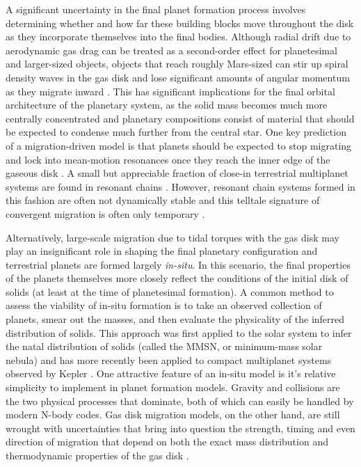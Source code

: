 A significant uncertainty in the final planet formation process involves determining whether and how far these building blocks move throughout the disk as they incorporate themselves into the final bodies. Although radial drift due to aerodynamic gas drag can be treated as a second-order effect for planetesimal and larger-sized objects, objects that reach roughly Mars-sized can stir up spiral density waves in the gas disk and lose significant amounts of angular momentum as they migrate inward \cite{ward97}. This has significant implications for the final orbital architecture of the planetary system, as the solid mass becomes much more centrally concentrated and planetary compositions consist of material that should be expected to condense much further from the central star. One key prediction of a migration-driven model is that planets should be expected to stop migrating and lock into mean-motion resonances once they reach the inner edge of the gaseous disk \cite{hands14}. A small but appreciable fraction of close-in terrestrial multiplanet systems are found in resonant chains \cite{gillon16, gillon17, christiansen18, agol21, leleu21}. However, resonant chain systems formed in this fashion are often not dynamically stable and this telltale signature of convergent migration is often only temporary \cite{terquem07, pierens11, izidoro17, mcnally19}.

Alternatively, large-scale migration due to tidal torques with the gas disk may play an insignificant role in shaping the final planetary configuration and terrestrial planets are formed largely \textit{in-situ}. In this scenario, the final properties of the planets themselves more closely reflect the conditions of the initial disk of solids (at least at the time of planetesimal formation). A common method to assess the viability of in-situ formation is to take an observed collection of planets, smear out the masses, and then evaluate the physicality of the inferred distribution of solids. This approach was first applied to the solar system to infer the natal distribution of solids (called the MMSN, or minimum-mass solar nebula) \cite{hayashi81} and has more recently been applied to compact multiplanet systems observed by Kepler \cite{chiang13, dai20}. One attractive feature of an in-situ model is it's relative simplicity to implement in planet formation models. Gravity and collisions are the two physical processes that dominate, both of which can easily be handled by modern N-body codes. Gas disk migration models, on the other hand, are still wrought with uncertainties that bring into question the strength, timing and even direction of migration that depend on both the exact mass distribution and thermodynamic properties of the gas disk \cite{ayliffe10, bitsch13, ogihara18}.

